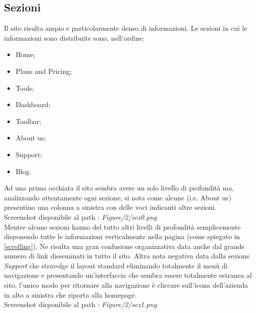 \subsection{Sezioni}
Il sito risulta ampio e particolarmente denso di informazioni. Le sezioni in cui
le informazioni sono distribuite sono, nell'ordine:
\begin{itemize}
	\item Home;
	\item Plans and Pricing;
	\item Tools;
	\item Dashboard;
	\item Toolbar;
	\item About us;
	\item Support;
	\item Blog.
\end{itemize}
Ad una prima occhiata il sito sembra avere un solo livello di profondità ma,
analizzando attentamente ogni sezione, si nota come alcune (i.e. About us) 
presentino una colonna a sinistra con delle voci indicanti altre sezioni. \\
Screenshot disponibile al path : \textit{Figure/2/sez0.png} \\ 
Mentre alcune sezioni hanno  del tutto altri livelli di 
profondità semplicemente disponendo tutte le informazioni verticalmente nella 
pagina (come spiegato in \ref{scrolling}). Ne risulta una gran confusione 
organizzativa data anche dal grande numero di link disseminati
in tutto il sito. Altra nota negativa data dalla sezione \textit{Support} 
che stravolge il layout standard eliminando totalmente il menù di navigazione e
presentando un'interfaccia che sembra essere totalmente estranea al sito, l'unico
modo per ritornare alla navigazione è cliccare sull'icona dell'azienda in alto
a sinistra che riporta alla homepage. \\
Screenshot disponibile al path : \textit{Figure/2/sez1.png} \\ 
